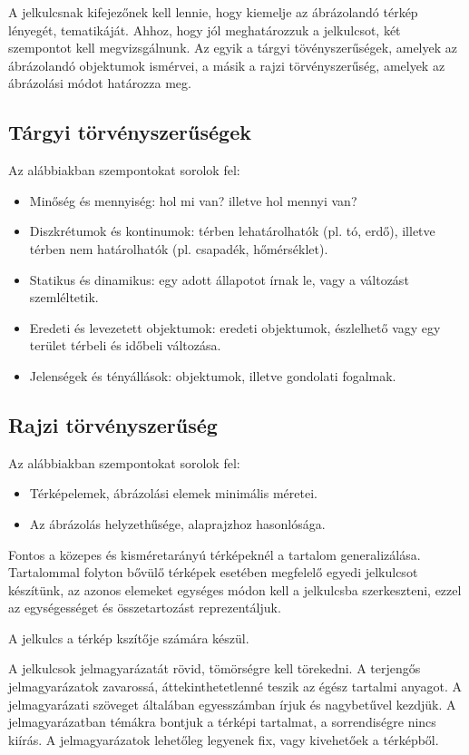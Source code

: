 		A jelkulcsnak kifejezőnek kell lennie, hogy kiemelje az ábrázolandó térkép lényegét, tematikáját. Ahhoz, hogy jól meghatározzuk
		a jelkulcsot, két szempontot kell megvizsgálnunk. Az egyik a tárgyi tövényszerűségek, amelyek az ábrázolandó objektumok ismérvei,
		a másik a rajzi törvényszerűség, amelyek az ábrázolási módot határozza meg.
		
		\subsection{Tárgyi törvényszerűségek}
		Az alábbiakban szempontokat sorolok fel:
		\begin{itemize}
			\item Minőség és mennyiség: hol mi van? illetve hol mennyi van?
			\item Diszkrétumok és kontinumok: térben lehatárolhatók (pl. tó, erdő), illetve térben nem határolhatók (pl. csapadék, hőmérséklet).
			\item Statikus és dinamikus: egy adott állapotot írnak le, vagy a változást szemléltetik.
			\item Eredeti és levezetett objektumok: eredeti objektumok, észlelhető vagy egy terület térbeli és időbeli változása.
			\item Jelenségek és tényállások: objektumok, illetve gondolati fogalmak.
		\end{itemize}
		\subsection{Rajzi törvényszerűség}
		Az alábbiakban szempontokat sorolok fel:
		\begin{itemize}
			\item Térképelemek, ábrázolási elemek minimális méretei.
			\item Az ábrázolás helyzethűsége, alaprajzhoz hasonlósága.
		\end{itemize}
		Fontos a közepes és kisméretarányú térképeknél a tartalom generalizálása. Tartalommal folyton bővülő térképek esetében megfelelő 
		egyedi jelkulcsot készítünk, az azonos elemeket egységes módon kell a jelkulcsba szerkeszteni, ezzel az egységességet és összetartozást
		reprezentáljuk.
		
		A jelkulcs a térkép kszítője számára készül.
		
		A jelkulcsok jelmagyarázatát rövid, tömörségre kell törekedni. A terjengős jelmagyarázatok zavarossá, áttekinthetetlenné teszik az égész
		tartalmi anyagot. A jelmagyarázati szöveget általában egyesszámban írjuk és nagybetűvel kezdjük. A jelmagyarázatban témákra bontjuk a
		térképi tartalmat, a sorrendiségre nincs kiírás. A jelmagyarázatok lehetőleg legyenek fix, vagy kivehetőek a térképből.
